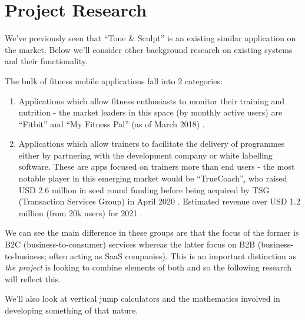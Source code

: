 \chapter{Project Research}
\label{chap:research}
We've previously seen that ``Tone \& Sculpt'' is an existing similar application
on the market. Below we'll consider other background research on existing
systems and their functionality.

The bulk of fitness mobile applications fall into 2 categories:
\begin{enumerate}
	\item Applications which allow fitness enthusiasts to monitor their training
	      and nutrition - the market leaders in this space
	      (by monthly active users) are ``Fitbit''
	      and ``My Fitness Pal'' (as of March 2018) \cite{statista-monthly-users}.
	\item Applications which allow trainers to facilitate the delivery of programmes
	      either by partnering with the development company or white labelling software.
	      These are apps focused on trainers more than end users - the most notable player
	      in this emerging market would be ``TrueCoach''\href{https://truecoach.co/} , who
	      raised USD 2.6 million in seed round funding before being
	      acquired by TSG (Transaction Services Group) in April 2020 \cite{truecoach-funding}.
	      Estimated revenue over USD 1.2 million (from 20k users) for 2021 \cite{truecoach-revenue}.
\end{enumerate}

We can see the main difference in these groups are that
the focus of the former is B2C (business-to-consumer) services
whereas the latter focus on B2B (business-to-business; often acting as SaaS companies).
This is an important distinction as \textit{the project} is looking to combine elements
of both and so the following research will reflect this.
\par
We'll also look at vertical jump calculators and the mathematics involved in developing
something of that nature.
\pagebreak

